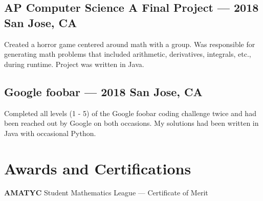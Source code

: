 \documentclass[letterpaper,12pt]{article}
\begin{document}
	\subsection{AP Computer Science A Final Project --- 2018 \null\hfill San Jose, CA}
	\par Created a horror game centered around math with a group. Was responsible for generating math problems that included arithmetic, derivatives, integrals, etc., during runtime. Project was written in Java.
	\vspace*{-2mm}
	\subsection{Google foobar --- 2018 \null\hfill San Jose, CA}
	\par Completed all levels (1 - 5) of the Google foobar coding challenge twice and had been reached out by Google on both occasions.
	\vspace*{-2mm}
	My solutions had been written in Java with occasional Python.
\section{Awards and Certifications}
	{\bfseries AMATYC} Student Mathematics League --- Certificate of Merit
\end{document}
